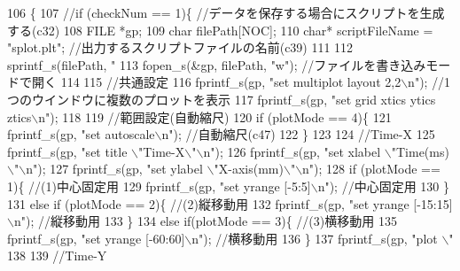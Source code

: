 \begin{DoxyCode}
106 \{
107     \textcolor{comment}{//if (checkNum == 1)\{ //データを保存する場合にスクリプトを生成する(c32)}
108         FILE *gp; 
109         \textcolor{keywordtype}{char} filePath[NOC]; 
110         \textcolor{keywordtype}{char}* scriptFileName = \textcolor{stringliteral}{"splot.plt"}; \textcolor{comment}{//出力するスクリプトファイルの名前(c39)}
111 
112         sprintf\_s(filePath, \textcolor{stringliteral}{"%
113         fopen\_s(&gp, filePath, \textcolor{stringliteral}{"w"}); \textcolor{comment}{//ファイルを書き込みモードで開く}
114 
115         \textcolor{comment}{//共通設定}
116         fprintf\_s(gp, \textcolor{stringliteral}{"set multiplot layout 2,2\(\backslash\)n"}); \textcolor{comment}{//1つのウインドウに複数のプロットを表示}
117         fprintf\_s(gp, \textcolor{stringliteral}{"set grid xtics ytics ztics\(\backslash\)n"});
118 
119         \textcolor{comment}{//範囲設定(自動縮尺)}
120         \textcolor{keywordflow}{if} (plotMode == 4)\{
121             fprintf\_s(gp, \textcolor{stringliteral}{"set autoscale\(\backslash\)n"}); \textcolor{comment}{//自動縮尺(c47)}
122         \}
123 
124         \textcolor{comment}{//Time-X}
125         fprintf\_s(gp, \textcolor{stringliteral}{"set title \(\backslash\)"Time-X\(\backslash\)"\(\backslash\)n"});
126         fprintf\_s(gp, \textcolor{stringliteral}{"set xlabel \(\backslash\)"Time(ms)\(\backslash\)"\(\backslash\)n"});
127         fprintf\_s(gp, \textcolor{stringliteral}{"set ylabel \(\backslash\)"X-axis(mm)\(\backslash\)"\(\backslash\)n"});
128         \textcolor{keywordflow}{if} (plotMode == 1)\{ \textcolor{comment}{//(1)中心固定用}
129             fprintf\_s(gp, \textcolor{stringliteral}{"set yrange [-5:5]\(\backslash\)n"}); \textcolor{comment}{//中心固定用}
130         \}
131         \textcolor{keywordflow}{else} \textcolor{keywordflow}{if} (plotMode == 2)\{ \textcolor{comment}{//(2)縦移動用}
132             fprintf\_s(gp, \textcolor{stringliteral}{"set yrange [-15:15]\(\backslash\)n"}); \textcolor{comment}{//縦移動用}
133         \}
134         \textcolor{keywordflow}{else} \textcolor{keywordflow}{if}(plotMode == 3)\{ \textcolor{comment}{//(3)横移動用}
135             fprintf\_s(gp, \textcolor{stringliteral}{"set yrange [-60:60]\(\backslash\)n"}); \textcolor{comment}{//横移動用}
136         \}
137         fprintf\_s(gp, \textcolor{stringliteral}{"plot \(\backslash\)"%
138 
139         \textcolor{comment}{//Time-Y}
}}
\end{DoxyCode}
